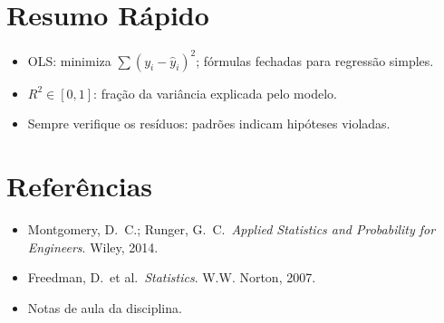 \documentclass[12pt,a4paper]{article}
\begin{document}
\section*{Resumo R\'apido}
\begin{itemize}
  \item OLS: minimiza $\sum(y_i - \hat y_i)^2$; f\'ormulas fechadas para regress\~ao simples.
  \item $R^2 \in [0,1]$: fra\c{c}\~ao da vari\^ancia explicada pelo modelo.
  \item Sempre verifique os res\'iduos: padr\~oes indicam hip\'oteses violadas.
\end{itemize}

\section*{Refer\^encias}
\begin{itemize}
  \item Montgomery, D.\ C.; Runger, G.\ C.\ \textit{Applied Statistics and Probability for Engineers}. Wiley, 2014.
  \item Freedman, D.\ et al.\ \textit{Statistics}. W.W. Norton, 2007.
  \item Notas de aula da disciplina.
\end{itemize}
\end{document}
